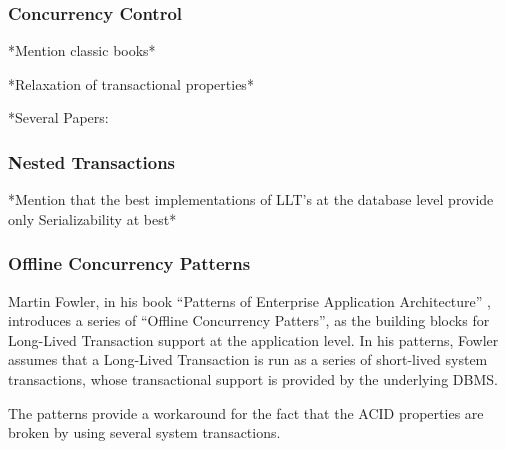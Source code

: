 \documentclass{llncs}
\begin{document}
\subsubsection{Concurrency Control}

*Mention classic books*

*Relaxation of transactional properties*

*Several Papers: \cite{hagmann1991implementing} \cite{garcia1987sagas}
\cite{salem1989altruistic}

\subsubsection{Nested Transactions}

*Mention that the best implementations of LLT's at the database level
provide only Serializability at best*

\subsubsection{Offline Concurrency Patterns}

Martin Fowler, in his book ``Patterns of Enterprise Application
Architecture'' \cite{fowler2003patterns}, introduces a series of
``Offline Concurrency Patters'', as the building blocks for Long-Lived
Transaction support at the application level. In his patterns, Fowler
assumes that a Long-Lived Transaction is run as a series of
short-lived system transactions, whose transactional support is
provided by the underlying DBMS.

The patterns provide a workaround for the fact that the ACID
properties are broken by using several system transactions.
\end{document}
